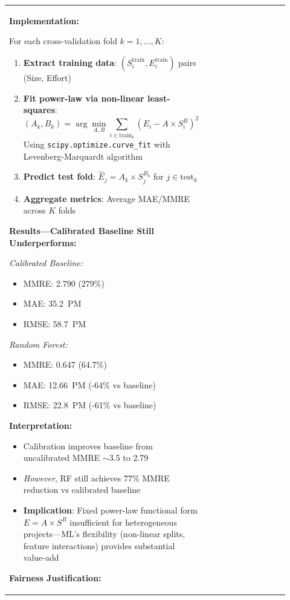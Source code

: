 \documentclass[11pt,a4paper]{article}
\begin{document}
\begin{longtable}{>{\raggedright\arraybackslash}p{0.26\linewidth}|>{\raggedright\arraybackslash}p{0.44\linewidth}|>{\raggedright\arraybackslash}p{0.22\linewidth}}
\textbf{Implementation:}

For each cross-validation fold $k=1,\ldots,K$:
\begin{enumerate}
    \item \textbf{Extract training data}: $(S_i^{\text{train}}, E_i^{\text{train}})$ pairs (Size, Effort)
    \item \textbf{Fit power-law via non-linear least-squares}:
$$ (A_k, B_k) = \arg\min_{A,B} \sum_{i \in \text{train}_k} (E_i - A \times S_i^B)^2 $$
    Using \texttt{scipy.optimize.\allowbreak curve\_fit} with Levenberg-\allowbreak Marquardt algorithm
    \item \textbf{Predict test fold}: $\hat{E}_j = A_k \times S_j^{B_k}$ for $j \in \text{test}_k$
    \item \textbf{Aggregate metrics}: Average MAE/MMRE across $K$ folds
\end{enumerate}

\textbf{Results---Calibrated Baseline Still Underperforms:}

\textit{Calibrated Baseline:}
\begin{itemize}
    \item MMRE: 2.790 (279\%)
    \item MAE: 35.2~PM
    \item RMSE: 58.7~PM
\end{itemize}

\textit{Random Forest:}
\begin{itemize}
    \item MMRE: 0.647 (64.7\%)
    \item MAE: 12.66~PM (-64\% vs baseline)
    \item RMSE: 22.8~PM (-61\% vs baseline)
\end{itemize}

\textbf{Interpretation:}
\begin{itemize}
    \item Calibration improves baseline from uncalibrated MMRE $\sim$3.5 to 2.79
    \item \textit{However}, RF still achieves 77\% MMRE reduction vs calibrated baseline
    \item \textbf{Implication}: Fixed power-law functional form $E=A \times S^B$ insufficient for heterogeneous projects---ML's flexibility (non-linear splits, feature interactions) provides substantial value-add
\end{itemize}

\textbf{Fairness Justification:}


\end{longtable}
\end{document}
